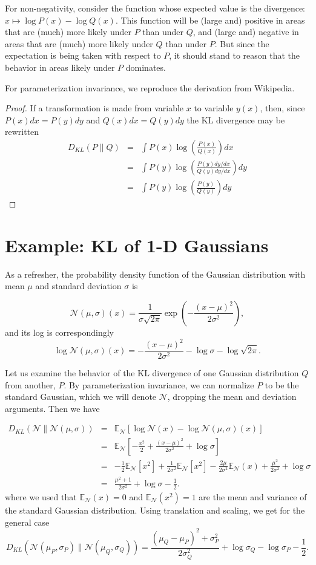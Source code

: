 \documentclass[12pt]{article}
\newcommand{\E}{\mathbb{E}}
\newcommand{\N}{\mathcal{N}}
\begin{document}
For non-negativity, consider the function whose expected value is the
divergence: $x \mapsto \log P(x) - \log Q(x)$.  This function will be
(large and) positive in areas that are (much) more likely under $P$
than under $Q$, and (large and) negative in areas that are (much) more
likely under $Q$ than under $P$.  But since the expectation is being
taken with respect to $P$, it should stand to reason that the behavior
in areas likely under $P$ dominates.

For parameterization invariance, we reproduce the derivation from Wikipedia.
\begin{proof}
If a transformation is made from variable $x$ to variable $y(x)$,
then, since $P(x) dx = P(y) dy$ and $Q(x) dx = Q(y) dy$ the KL divergence
may be rewritten
\begin{eqnarray*}
 D_{KL}(P\|Q) & = & \int P(x) \log \left( \frac{P(x)}{Q(x)} \right) dx \\
  & = & \int P(y) \log \left( \frac{P(y)dy/dx}{Q(y)dy/dx} \right) dy \\
  & = & \int P(y) \log \left( \frac{P(y)}{Q(y)} \right) dy
\end{eqnarray*}
\end{proof}

\section{Example: KL of 1-D Gaussians}
\label{sec:example}

As a refresher, the probability density function of the Gaussian
distribution with mean $\mu$ and standard deviation $\sigma$ is

\[ \N(\mu,\sigma)(x) = \frac{1}{\sigma \sqrt{2 \pi}} \exp \left(-\frac{(x-\mu)^2}{2\sigma^2} \right), \]
and its log is correspondingly
\[ \log \N(\mu,\sigma)(x) = -\frac{(x-\mu)^2}{2\sigma^2} - \log \sigma - \log \sqrt{2\pi}. \]

Let us examine the behavior of the KL divergence of one Gaussian
distribution $Q$ from another, $P$.  By parameterization invariance,
we can normalize $P$ to be the standard Gaussian, which we will denote
$\N$, dropping the mean and deviation arguments.  Then we have

\begin{eqnarray*}
 D_{KL}(\N\|\N(\mu,\sigma)) & = & \E_\N \left[ \log \N(x) - \log \N(\mu,\sigma)(x) \right] \\
 & = & \E_\N \left[ -\frac{x^2}{2} + \frac{(x-\mu)^2}{2\sigma^2} + \log \sigma \right] \\
 & = & -\frac{1}{2} \E_\N[x^2] + \frac{1}{2\sigma^2} \E_\N[x^2] - \frac{2\mu}{2\sigma^2}\E_\N(x)
       + \frac{\mu^2}{2\sigma^2} + \log \sigma \\
 & = & \frac{\mu^2 + 1}{2\sigma^2} + \log \sigma - \frac{1}{2}.
\end{eqnarray*}
where we used that $\E_\N(x) = 0$ and $\E_\N(x^2) = 1$ are
the mean and variance of the standard Gaussian distribution.
Using translation and scaling, we get for the general case
\[ D_{KL}(\N(\mu_P,\sigma_P)\|\N(\mu_Q,\sigma_Q)) = \frac{(\mu_Q-\mu_P)^2 + \sigma_P^2}{2\sigma_Q^2} + \log \sigma_Q - \log \sigma_P - \frac{1}{2}. \]
\end{document}
